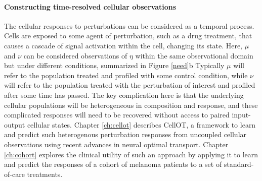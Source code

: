 \paragraph{Constructing time-resolved cellular observations}
The cellular responses to perturbations can be considered as a temporal process.
Cells are exposed to some agent of perturbation, such as a drug treatment, that causes a cascade of signal activation within the cell, changing its state.
Here, $\mu$ and $\nu$ can be considered observations of $\eta$ within the same observational domain but under different conditions, summarized in Figure \ref{need}b
Typically $\mu$ will refer to the population treated and profiled with some control condition, while $\nu$ will refer to the population treated with the perturbation of interest and profiled after some time has passed.
The key complication here is that the underlying cellular populations will be heterogeneous in composition and response, and these complicated responses will need to be recovered without access to paired input-output cellular states.
Chapter \ref{ch:cellot} describes CellOT, a framework to learn and predict such heterogenous perturbation responses from uncoupled cellular observations using recent advances in neural optimal transport.
Chapter \ref{ch:cohort} explores the clinical utility of such an approach by applying it to learn and predict the responses of a cohort of melanoma patients to a set of standard-of-care treatments.
